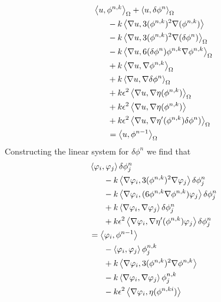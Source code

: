 \documentclass{article}
\newcommand\ang[1]{\left\langle #1 \right\rangle}
\begin{document}
\begin{align}
    &\ang{u, \phi^{n,k}}_\Omega + \ang{u,\delta\phi^n}_\Omega\\
    &\hspace{4ex}- k \ang{\nabla u, 3(\phi^{n,k})^2\nabla(\phi^{n,k})}\\
    &\hspace{4ex}- k \ang{\nabla u, 3(\phi^{n,k})^2\nabla(\delta \phi^n)}_\Omega\\ 
    &\hspace{4ex}- k \ang{\nabla u, 6(\delta\phi^n)\phi^{n,k}\nabla\phi^{n,k}}_\Omega\\
    &\hspace{4ex}+ k\ang{\nabla u, \nabla \phi^{n,k}}_\Omega\\ 
    &\hspace{4ex}+ k\ang{\nabla u, \nabla\delta\phi^n}_\Omega\\ 
    &\hspace{4ex}+ k\epsilon^2\ang{\nabla u,\nabla \eta(\phi^{n,k})}_\Omega\\
    &\hspace{4ex}+ k\epsilon^2\ang{\nabla u, \nabla\eta(\phi^{n,k})}\\
    &\hspace{4ex}+ k\epsilon^2\ang{\nabla u, \nabla\eta'(\phi^{n,k})\delta\phi^n)}_\Omega\\
    &\hspace{4ex}= \ang{u, \phi^{n-1}}_\Omega
\end{align}
Constructing the linear system for $\delta\phi^n$ we find that
\begin{align}
    &\ang{\varphi_i, \varphi_j}\delta\phi^n_j\\
    &\hspace{4ex}- k\ang{\nabla \varphi_i, 3(\phi^{n,k})^2\nabla\varphi_j}\delta\phi^n_j\\
    &\hspace{4ex}- k\ang{\nabla \varphi_i, (6\phi^{n,k}\nabla\phi^{n,k})\varphi_j}\delta\phi^n_j\\
    &\hspace{4ex}+ k\ang{\nabla \varphi_i, \nabla\varphi_j}\delta\phi^n_j\\
    &\hspace{4ex}+ k\epsilon^2\ang{\nabla\varphi_i, \nabla\eta'(\phi^{n,k})\varphi_j}\delta\phi^n_j\\
    &= \ang{\varphi_i, \phi^{n-1}}\\
    &\hspace{4ex}-\ang{\varphi_i, \varphi_j}\phi^{n,k}_j\\
    &\hspace{4ex}+k\ang{\nabla\varphi_i, 3(\phi^{n,k})^2\nabla\phi^{n,k}}\\
    &\hspace{4ex}-k\ang{\nabla\varphi_i, \nabla\varphi_j}\phi^{n,k}_j\\
    &\hspace{4ex}-k\epsilon^2\ang{\nabla\varphi_i,\eta(\phi^{n,ki})}
\end{align}
\end{document}
